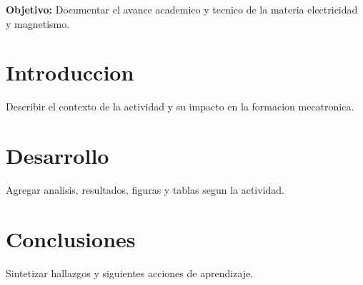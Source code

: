 \documentclass[spanish,letterpaper,oneside]{article}
\begin{document}
\templatePortrait
\templatePagecfg
\onehalfspacing

\begin{abstractd}
\textbf{Objetivo:} Documentar el avance academico y tecnico de la materia electricidad y magnetismo.
\end{abstractd}

\templateIndex
\templateFinalcfg

\section{Introduccion}
Describir el contexto de la actividad y su impacto en la formacion mecatronica.

\section{Desarrollo}
Agregar analisis, resultados, figuras y tablas segun la actividad.

\section{Conclusiones}
Sintetizar hallazgos y siguientes acciones de aprendizaje.



\end{document}
